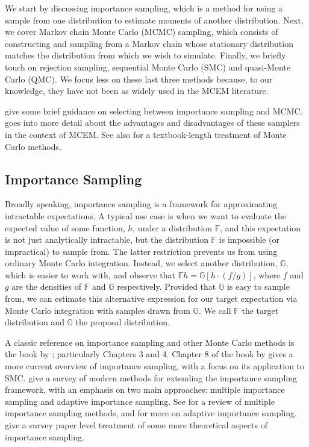 \documentclass[ss]{imsart}
\theoremstyle{plain}
\theoremstyle{definition}
\theoremstyle{remark}
\newcommand{\bF}{\mathbb{F}}
\newcommand{\bG}{\mathbb{G}}
\begin{document}
We start by discussing importance sampling, which is a method for using a sample from one distribution to estimate moments of another distribution. Next, we cover Markov chain Monte Carlo (MCMC) sampling, which consists of constructing and sampling from a Markov chain whose stationary distribution matches the distribution from which we wish to simulate. Finally, we briefly touch on rejection sampling, sequential Monte Carlo (SMC) and quasi-Monte Carlo (QMC). We focus less on these last three methods because, to our knowledge, they have not been as widely used in the MCEM literature.

\citet{Del99} give some brief guidance on selecting between importance sampling and MCMC. \citet{Jan06II} goes into more detail about the advantages and disadvantages of these samplers in the context of MCEM. See also \citet{Rob04} for a textbook-length treatment of Monte Carlo methods.

\subsection{Importance Sampling}
\label{sec:imp_samp}

Broadly speaking, importance sampling is a framework for approximating intractable expectations. A typical use case is when we want to evaluate the expected value of some function, $h$, under a distribution $\bF$, and this expectation is not just analytically intractable, but the distribution $\bF$ is impossible (or impractical) to sample from. The latter restriction prevents us from using ordinary Monte Carlo integration. Instead, we select another distribution, $\bG$, which is easier to work with, and observe that $\bF h = \bG [h \cdot (f/g)]$, where $f$ and $g$ are the densities of $\bF$ and $\bG$ respectively. Provided that $\bG$ is easy to sample from, we can estimate this alternative expression for our target expectation via Monte Carlo integration with samples drawn from $\bG$. We call $\bF$ the target distribution and $\bG$ the proposal distribution.  

A classic reference on importance sampling and other Monte Carlo methods is the book by \citet{Rob04}; particularly Chapters 3 and 4. Chapter 8 of the book by \citet{Cho20} gives a more current overview of importance sampling, with a focus on its application to SMC. \citet{Elv22} give a survey of modern methods for extending the importance sampling framework, with an emphasis on two main approaches: multiple importance sampling and adaptive importance sampling. See \citet{Elv19} for a review of multiple importance sampling methods, and \citet{Bug17} for more on adaptive importance sampling. \citet{Aga17} give a survey paper level treatment of some more theoretical aspects of importance sampling.
\end{document}
